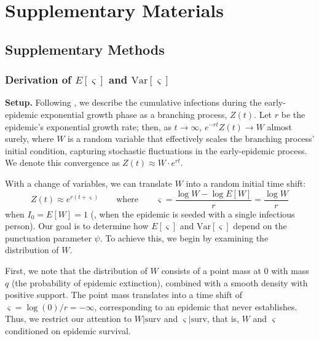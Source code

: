\section{Supplementary Materials}
\subsection{Supplementary Methods}


\subsubsection{Derivation of $E[\varsigma]$ and $\text{Var}[\varsigma]$}
\label{sec:supplementary_methods_timeshift}


{\bf Setup.} Following \citet{morris_computation_2024}, we describe the cumulative infections during the early-epidemic exponential growth phase as a branching process, $Z(t)$. Let $r$ be the epidemic's exponential growth rate; then, as $t \rightarrow \infty$, $e^{-rt} Z(t) \rightarrow W$ almost surely, where $W$ is a random variable that effectively scales the branching process' initial condition, capturing stochastic fluctuations in the early-epidemic process. We denote this convergence as $Z(t) \approx W \cdot e^{rt}$. 


With a change of variables, we can translate $W$ into a random initial time shift: 
%
\begin{equation}
	Z(t) \approx e^{r (t + \varsigma)} \qquad \text{where} \qquad \varsigma = \frac{\log W - \log E[W]}{r} = \frac{\log W}{r}
\end{equation}
%
when $I_0 = E[W] = 1$ (\ie, when the epidemic is seeded with a single infectious person). Our goal is to determine how $E[\varsigma]$ and $\text{Var}[\varsigma]$ depend on the punctuation parameter $\psi$. To achieve this, we begin by examining the distribution of $W$. 

 First, we note that the distribution of $W$ consists of a point mass at 0 with mass $q$ (the probability of epidemic extinction), combined with a smooth density with positive support. The point mass translates into a time shift of $\varsigma = \log(0) / r = -\infty$, corresponding to an epidemic that never establishes. Thus, we restrict our attention to $W | \text{surv}$ and $\varsigma | \text{surv}$, that is, $W$ and $\varsigma$ conditioned on epidemic survival. 

